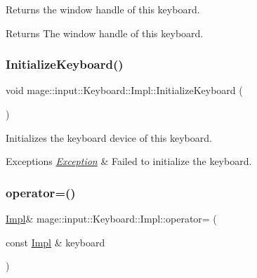 Returns the window handle of this keyboard.

\begin{DoxyReturn}{Returns}
The window handle of this keyboard. 
\end{DoxyReturn}
\mbox{\label{classmage_1_1input_1_1_keyboard_1_1_impl_ae4854db552c4651503ec30bb6a477cae}} 
\subsubsection{\texorpdfstring{Initialize\+Keyboard()}{InitializeKeyboard()}}
{\footnotesize\ttfamily void mage\+::input\+::\+Keyboard\+::\+Impl\+::\+Initialize\+Keyboard (\begin{DoxyParamCaption}{ }\end{DoxyParamCaption})\hspace{0.3cm}{\ttfamily [private]}}

Initializes the keyboard device of this keyboard.


\begin{DoxyExceptions}{Exceptions}
{\em \mbox{\hyperlink{classmage_1_1_exception}{Exception}}} & Failed to initialize the keyboard. \\
\hline
\end{DoxyExceptions}
\mbox{\label{classmage_1_1input_1_1_keyboard_1_1_impl_adf6d3d47c39fbef1ee288aeeda5c55a0}} 
\subsubsection{\texorpdfstring{operator=()}{operator=()}\hspace{0.1cm}{\footnotesize\ttfamily [1/2]}}
{\footnotesize\ttfamily \mbox{\hyperlink{classmage_1_1input_1_1_keyboard_1_1_impl}{Impl}}\& mage\+::input\+::\+Keyboard\+::\+Impl\+::operator= (\begin{DoxyParamCaption}\item[{const \mbox{\hyperlink{classmage_1_1input_1_1_keyboard_1_1_impl}{Impl}} \&}]{keyboard }\end{DoxyParamCaption})\hspace{0.3cm}{\ttfamily [delete]}}

